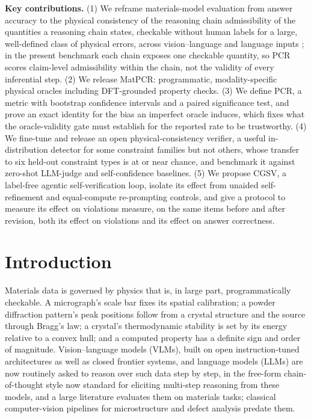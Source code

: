 \documentclass[pdflatex,sn-nature]{sn-jnl}
\newcommand{\rev}[1]{#1} %
\newcommand{\rev}[1]{{\color{blue}#1}} %
\providecommand{\DIFadd}[1]{{\protect\color{blue} \sf #1}} %
\providecommand{\DIFdel}[1]{{\protect\color{red} \scriptsize #1}} %
\providecommand{\DIFaddbegin}{} %
\providecommand{\DIFaddend}{} %
\providecommand{\DIFdelbegin}{} %
\providecommand{\DIFdelend}{} %
\providecommand{\DIFscaledelfig}{0.5}
\newlength{\DIFdelgraphicswidth} %
\newlength{\DIFdelgraphicsheight} %
\providecommand{\DIFaddincludegraphics}[2][]{{\color{blue}\fbox{\DIFOincludegraphics[#1]{#2}}}} %
\providecommand{\DIFdelincludegraphics}[2][]{%
\sbox{\DIFdelgraphicsbox}{\DIFOincludegraphics[#1]{#2}}%
\settoboxwidth{\DIFdelgraphicswidth}{\DIFdelgraphicsbox} %
\settoboxtotalheight{\DIFdelgraphicsheight}{\DIFdelgraphicsbox} %
\scalebox{\DIFscaledelfig}{%
\parbox[b]{\DIFdelgraphicswidth}{\usebox{\DIFdelgraphicsbox}\\[-\baselineskip] \rule{\DIFdelgraphicswidth}{0em}}\llap{\resizebox{\DIFdelgraphicswidth}{\DIFdelgraphicsheight}{%
\setlength{\unitlength}{\DIFdelgraphicswidth}%
\begin{picture}(1,1)%
\thicklines\linethickness{2pt} %
{\color[rgb]{1,0,0}\put(0,0){\framebox(1,1){}}}%
{\color[rgb]{1,0,0}\put(0,0){\line( 1,1){1}}}%
{\color[rgb]{1,0,0}\put(0,1){\line(1,-1){1}}}%
\end{picture}%
}\hspace*{3pt}}} %
} %
\DeclareRobustCommand{\DIFaddbegin}{\DIFOaddbegin \let\includegraphics\DIFaddincludegraphics} %
\DeclareRobustCommand{\DIFaddend}{\DIFOaddend \let\includegraphics\DIFOincludegraphics} %
\DeclareRobustCommand{\DIFdelbegin}{\DIFOdelbegin \let\includegraphics\DIFdelincludegraphics} %
\DeclareRobustCommand{\DIFdelend}{\DIFOaddend \let\includegraphics\DIFOincludegraphics} %
\begin{document}
\noindent\begin{tcolorbox}[colback=gray!6,colframe=gray!50,boxrule=0.5pt]
\textbf{Key contributions.} (1) We reframe materials-model evaluation from answer accuracy to the physical
\DIFdelbegin \DIFdel{consistency of the reasoning chain}\DIFdelend \DIFaddbegin \DIFadd{\rev{admissibility of the quantities a reasoning chain states}}\DIFaddend , checkable without human labels for a large,
well-defined class of physical errors, across vision--language and language inputs\DIFaddbegin \DIFadd{\rev{; in the present benchmark each chain exposes one checkable quantity, so PCR scores claim-level admissibility within the chain, not the validity of every inferential step}}\DIFaddend . (2) We release MatPCR: programmatic,
modality-specific physical oracles including DFT-grounded property checks. (3) We
define PCR, a metric with bootstrap confidence intervals and a paired significance
test, and prove an exact identity for the bias an imperfect oracle induces, which fixes
what the oracle-validity gate must establish for the reported rate to be trustworthy.
(4) We fine-tune and release an open physical-consistency verifier, a useful
in-distribution detector \DIFaddbegin \DIFadd{\rev{for some constraint families but not others,} }\DIFaddend whose transfer to six held-out constraint types is at or near
chance,
and benchmark it against zero-shot LLM-judge and self-confidence baselines. (5) We
propose CGSV, a label-free agentic self-verification loop, isolate its effect from
unaided self-refinement and equal-compute re-prompting controls, and \DIFdelbegin \DIFdel{give a protocol to measure
its effect on violations}\DIFdelend \DIFaddbegin \DIFadd{\rev{measure, on the same items before and after revision, both its effect on violations and its effect on answer correctness}}\DIFaddend .
\end{tcolorbox}

\section*{Introduction}
Materials data is governed by physics that is, in large part, programmatically
checkable. A micrograph's scale bar fixes its spatial calibration; a powder
diffraction pattern's peak positions follow from a crystal structure and the source
through Bragg's law; a crystal's thermodynamic stability is set by its energy
relative to a convex hull; and a computed property has a definite sign and order of
magnitude. Vision--language models (VLMs), built on open instruction-tuned
architectures\cite{liu2024llava} as well as closed frontier systems, and language
models (LLMs) are now
routinely asked to reason over such data step by step, in the free-form
chain-of-thought style now standard for eliciting multi-step reasoning from these
models,\cite{wei2022cot} and a large literature evaluates them on
materials tasks;\cite{lai2025materials,npj2026vlmeval,choudhary2025microscopygpt,li2024mmsci}
classical computer-vision pipelines for microstructure and defect analysis predate
them.\cite{holm2020cv,li2018defect}
\end{document}
